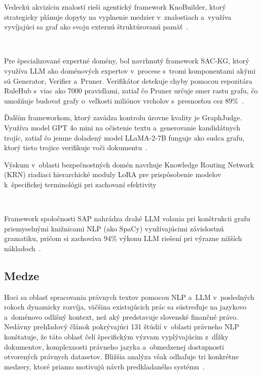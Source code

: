 Vedeckú akvizíciu znalostí rieši agentický framework KnoBuilder, ktorý strategicky plánuje dopyty na vyplnenie medzier v~znalostiach a~využíva vyvíjajúci sa graf ako svoju externú štruktúrovanú pamäť~\cite{knobuilder2025}.

\

Pre špecializované expertné domény, bol navrhnutý framework SAC-KG, ktorý využíva LLM ako doménových expertov v~procese s~tromi komponentami akými sú Generator, Verifier a~Pruner. Verifikátor detekuje chyby pomocou repozitára RuleHub s~viac ako 7000 pravidlami, zatiaľ čo Pruner určuje smer rastu grafu, čo umožňuje budovať grafy o~veľkosti miliónov vrcholov s~presnosťou cez 89\%~\cite{sackg2024}.

Ďalším frameworkom, ktorý zavádza kontrolu úrovne kvality je GraphJudge. Využíva model GPT 4o mini na očistenie textu a~generovanie kandidátnych trojíc, zatiaľ čo jemne doladený model LLaMA-2-7B funguje ako sudca grafu, ktorý tieto trojice verifikuje voči dokumentu~\cite{graphjudge2025}.


Výskum v~oblasti bezpečnostných domén navrhuje Knowledge Routing Network (KRN) riadiaci hierarchické moduly LoRA pre prispôsobenie modelov k~špecifickej terminológii pri zachovaní efektivity~\cite{peng2026construction}

\

Framework spoločnosti SAP nahrádza drahé LLM volania pri konštrukcii grafu priemyselnými knižnicami NLP (ako SpaCy) využívajúcimi závislostnú gramatiku, pričom si zachováva 94\% výkonu LLM riešení pri výrazne nižších nákladoch~\cite{sap2025}.


\subsection{Medze}

Hoci sa oblasť spracovania právnych textov pomocou NLP a~LLM v~posledných rokoch dynamicky rozvíja, väčšina existujúcich prác sa sústreďuje na jazykovo a~doménovo odlišný kontext, než aký predstavuje slovenské finančné právo. Nedávny prehľadový článok pokrývajúci 131 štúdií v~oblasti právneho NLP konštatuje, že táto oblasť čelí špecifickým výzvam vyplývajúcim z~dĺžky dokumentov, komplexnosti právneho jazyka a~obmedzenej dostupnosti otvorených právnych datasetov. Bližšia analýza však odhaľuje tri konkrétne medzery, ktoré priamo motivujú návrh predkladaného systému~\cite{nlpLegal2025}.



